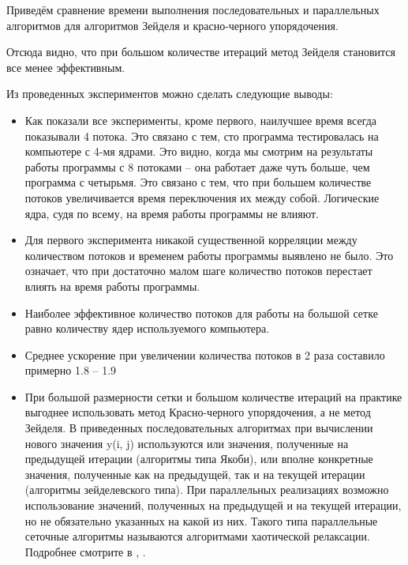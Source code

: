 \documentclass[a4paper, 14pt]{extreport}
\begin{document}
	\begin{center}
		\label{i2_9}
	\end{center}
	
	Приведём сравнение времени выполнения последовательных и параллельных алгоритмов для алгоритмов Зейделя и красно-черного упорядочения.
	
	Отсюда видно, что при большом количестве итераций метод Зейделя становится все менее эффективным.
	
	Из проведенных экспериментов можно сделать следующие выводы:
	\begin{itemize}
		\item Как показали все эксперименты, кроме первого, наилучшее время всегда показывали 4 потока. Это связано с тем, сто программа тестировалась на компьютере с 4-мя ядрами. Это видно, когда мы смотрим на результаты работы программы с 8 потоками – она работает даже чуть больше, чем программа с четырьмя. Это связано с тем, что при большем количестве потоков увеличивается время переключения их между собой. Логические ядра, судя по всему, на время работы программы не влияют.
		\item Для первого эксперимента никакой существенной корреляции между количеством потоков и временем работы программы выявлено не было. Это означает, что при достаточно малом шаге количество потоков перестает влиять на время работы программы.
		\item  Наиболее эффективное количество потоков для работы на большой сетке равно количеству ядер используемого компьютера.
		\item  Среднее ускорение при увеличении количества потоков в 2 раза составило примерно 1.8 – 1.9
		\item  При большой размерности сетки и большом количестве итераций на практике выгоднее использовать метод Красно-черного упорядочения, а не метод Зейделя. В приведенных последовательных алгоритмах при вычислении нового значения y(i, j) используются или значения, полученные на предыдущей итерации (алгоритмы типа Якоби), или вполне конкретные значения, полученные как на предыдущей, так и на текущей итерации (алгоритмы зейделевского типа). При параллельных реализациях возможно использование значений, полученных на предыдущей и на текущей итерации, но не обязательно указанных на какой из них. Такого типа параллельные сеточные алгоритмы называются алгоритмами хаотической релаксации.
Подробнее смотрите в \citealp{gergel}, \citealp{hey}.
	\end{itemize}
\end{document}
